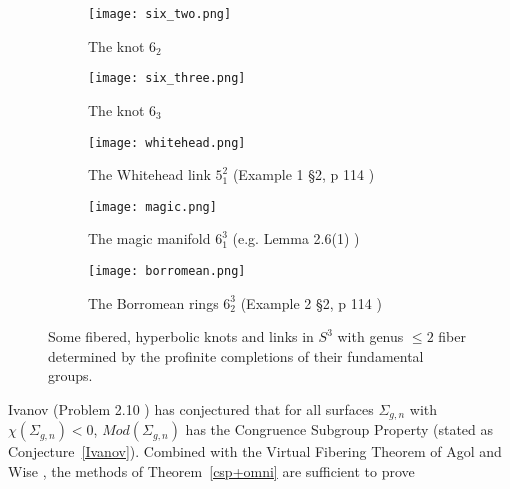 \documentclass[12pt, reqno,oneside]{amsart}
\theoremstyle{definition}
\theoremstyle{plain}
\theoremstyle{TheoremNum}
\numberwithin{equation}{section}
\numberwithin{table}{section}
\begin{document}
\begin{figure}[h]
     \centering
     \begin{subfigure}[b]{0.3\textwidth}
         \centering
         \texttt{[image: six\_two.png]}
         \caption{The knot $6_2$ \cite{knotinfo}}
         \label{fig:6_2}
     \end{subfigure}
     \hspace{0.5em}
     \begin{subfigure}[b]{0.3\textwidth}
         \centering
         \texttt{[image: six\_three.png]}
         \caption{The knot $6_3$ \cite{knotinfo}}
         \label{fig:6_3}
    \end{subfigure}
     \hspace{0.5em}
     \begin{subfigure}[b]{0.3\textwidth}
         \centering
         \texttt{[image: whitehead.png]}
         \caption{The Whitehead link $5^2_1$ (Example 1 \S 2, p 114 \cite{Thurston1986ANF})}
         \label{fig:whitehead}
     \end{subfigure}
     \hspace{0.5em}
     \begin{subfigure}[b]{0.3\textwidth}
         \centering
         \texttt{[image: magic.png]}
         \caption{The magic manifold $6^3_1$ (e.g. Lemma 2.6(1) \cite{EikoKin})}
         \label{magic}
     \end{subfigure}
     \hspace{0.5em}
     \begin{subfigure}[b]{0.3\textwidth}
         \centering
         \texttt{[image: borromean.png]}
         \caption{The Borromean rings $6^3_2$ (Example 2 \S 2, p 114 \cite{Thurston1986ANF})}
         \label{fig:borromean}
     \end{subfigure}
     \caption{Some fibered, hyperbolic knots and links in $S^3$ with genus $\leq 2$ fiber determined by the profinite completions of their fundamental groups.}
     \label{fig:knotslinks}
\end{figure}
\medbreak Ivanov \cite{Ivanov} (Problem 2.10 \cite{KirbyProblemList}) has conjectured that for all surfaces $\Sigma_{g,n}$ with $\chi(\Sigma_{g,n})<0$, $Mod(\Sigma_{g,n})$ has the Congruence Subgroup Property (stated as Conjecture~\ref{Ivanov}). Combined with the Virtual Fibering Theorem of Agol and Wise \cite{AgolHaken}\cite{WiseHaken}, the methods of Theorem~\ref{csp+omni} are sufficient to prove
\end{document}
